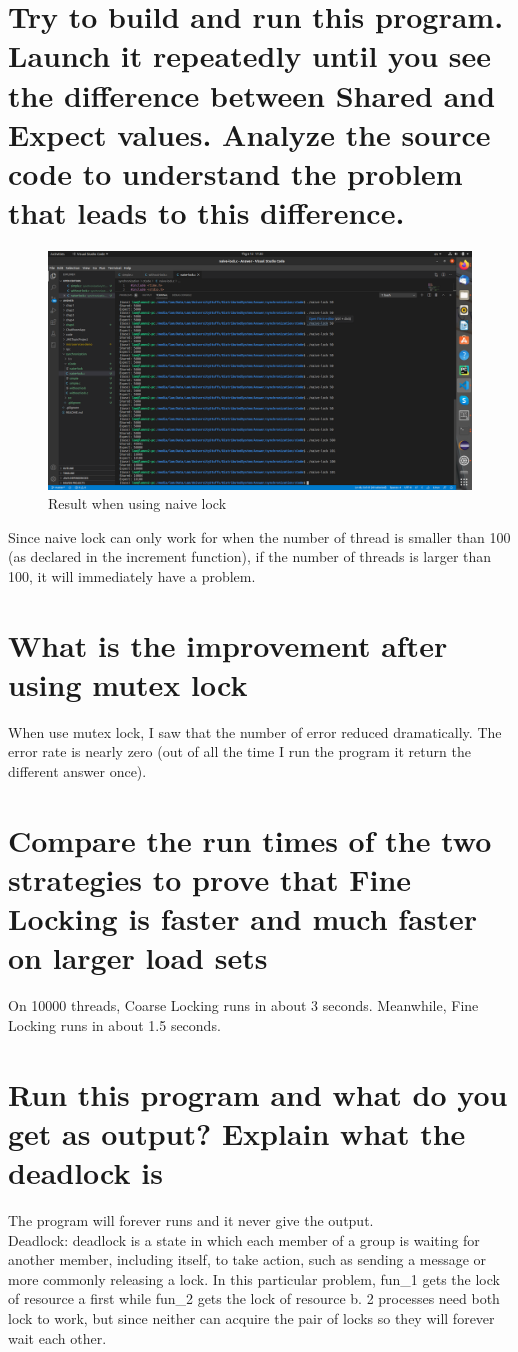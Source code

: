 \documentclass[11pt,a4paper]{report}
\begin{document}
\section{Try to build and run this program. Launch it repeatedly until you see the difference between Shared and Expect values. Analyze the source code to understand the problem that leads to this difference.}
\begin{figure}[h!]
	\centering
  	\includegraphics[width=\linewidth]{naive-lock.png}
  	\caption{Result when using naive lock}
  	\label{fig:naivelock}
\end{figure}
Since naive lock can only work for when the number of thread is smaller than 100 (as declared in the increment function), if the number of threads is larger than 100, it will immediately have a problem.

\section{What is the improvement after using mutex lock}
When use mutex lock, I saw that the number of error reduced dramatically. The error rate is nearly zero (out of all the time I run the program it return the different answer once). 

\section{Compare the run times of the two strategies to prove that Fine Locking is faster and much faster on larger load sets}
On 10000 threads, Coarse Locking runs in about 3 seconds. Meanwhile, Fine Locking runs in about 1.5 seconds.

\section{Run this program and what do you get as output? Explain what the deadlock is}
The program will forever runs and it never give the output.\\
Deadlock: deadlock is a state in which each member of a group is waiting for another member, including itself, to take action, such as sending a message or more commonly releasing a lock. In this particular problem, fun\_1 gets the lock of resource a first while fun\_2 gets the lock of resource b. 2 processes need both lock to work, but since neither can acquire the pair of locks so they will forever wait each other.
\end{document}
